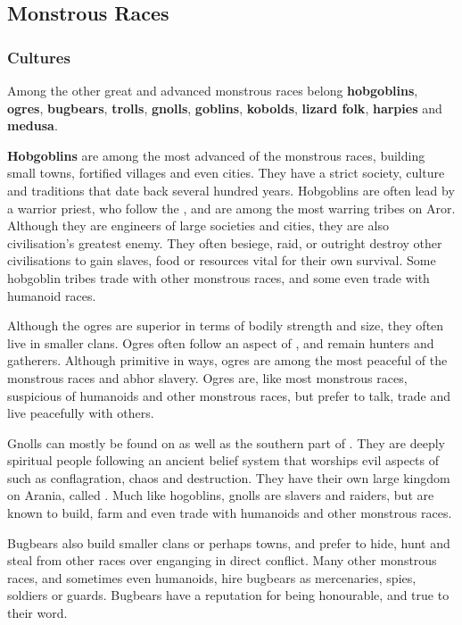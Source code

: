 \subsection{Monstrous Races}
\label{sec:Monstrous Races}

\subsubsection{Cultures}

Among the other great and advanced monstrous races belong \textbf{hobgoblins},
\textbf{ogres}, \textbf{bugbears}, \textbf{trolls}, \textbf{gnolls},
\textbf{goblins}, \textbf{kobolds}, \textbf{lizard folk}, \textbf{harpies}
and \textbf{medusa}.

\textbf{Hobgoblins} are among the most advanced of the monstrous races,
building small towns, fortified villages and even cities. They have a strict
society, culture and traditions that date back several hundred years. Hobgoblins
are often lead by a warrior priest, who follow the ,
and are among the most warring tribes on Aror. Although they are engineers of
large societies and cities, they are also civilisation's greatest enemy. They
often besiege, raid, or outright destroy other civilisations to gain slaves,
food or resources vital for their own survival. Some hobgoblin tribes trade
with other monstrous races, and some even trade with humanoid races.

Although the ogres are superior in terms of bodily strength and size, they
often live in smaller clans. Ogres often follow an aspect of
, and remain hunters and gatherers. Although primitive
in ways, ogres are among the most peaceful of the monstrous races and abhor
slavery. Ogres are, like most monstrous races, suspicious of humanoids and
other monstrous races, but prefer to talk, trade and live peacefully with
others.

Gnolls can mostly be found on  as well as the southern
part of . They are deeply spiritual people following an
ancient belief system that worships evil aspects of  such
as conflagration, chaos and destruction. They have their own large kingdom on
Arania, called . Much like hogoblins, gnolls are slavers
and raiders, but are known to build, farm and even trade with humanoids and
other monstrous races.

Bugbears also build smaller clans or perhaps towns, and prefer to hide, hunt
and steal from other races over enganging in direct conflict. Many other
monstrous races, and sometimes even humanoids, hire bugbears as mercenaries,
spies, soldiers or guards. Bugbears have a reputation for being honourable,
and true to their word.

